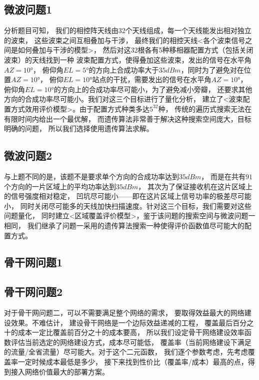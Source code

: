 \documentclass[UTF8,12pt]{ctexart}
\begin{document}
    \subsection{微波问题1}分析题目可知，
        我们的相控阵天线由32个天线组成，每一个天线能发出相对独立的波束，
        这些波束之间互相叠加与干涉，
        最终我们的相控天线<各个波束信号之间是如何叠加与干涉的模型>，
        然后对这32根各有5种移相器配置方式（包括关闭波束）的天线找到一种
        波束配置方式，使得叠加这些波束，发出的信号在水平角$AZ = 10°$，
        俯仰角$EL= 5°$的方向上合成功率大于$35dBm$，同时为了避免对在位置$AZ=10°$，
        俯仰$EL=10°$站点的干扰，需要发出的信号在水平角$AZ=10°$，
        俯仰角$EL=10°$的方向上的合成功率尽可能小，为了避免减小旁瓣，
        还要求其他方向的合成功率尽可能小。我们对这三个目标进行了量化分析，
        建立了<波束配置方式效用评价模型>。由于配置方式种类多达$5^{32}$种，
        传统的遍历式搜索无法在有限时间内给出一个最优解，
        而遗传算法非常善于解决这种搜索空间庞大，目标明确的问题，
        所以我们选择使用遗传算法求解。

    \subsection{微波问题2}
        与上题不同的是，该题不是要求单个方向的合成功率达到$35dBm$，
        而是在共有$91$个方向的一片区域上的平均功率达到$35dBm$，
        其次为了保证接收机在这片区域上的信号强度相对稳定，
        凹坑尽可能小——即在这片区域上信号功率的极差尽可能小，
        同时关闭尽可能多的天线加快扫描速度。针对这三个目标，我们需要对这些问题量化，
        同时建立<区域覆盖评价模型>，鉴于该问题的搜索空间与微波问题一相同，
        我们继承了问题一采用的遗传算法搜索一种使得评价函数值尽可能大的配置方式。

     
    \subsection{骨干网问题1}
    \subsection{骨干网问题2}
        对于骨干网问题二，可以不需要满足整个网络的需求，
        要取得效益最大的网络建设效果。不难估计，
        建设骨干网络是一个边际效益递减的工程，
        覆盖最后百分之十的成本一定比覆盖前百分之十的成本要高，
        所以我们设定骨干网络建设效率函数评估当前选定的网络建设方式，成本尽可能低，
        覆盖率（当前网络建设下满足的流量/全省流量）尽可能大。对于这个二元函数，
        我们逐个参数考虑，先考虑覆盖率一定时候成本最低是多少，
        接下来找到性价比（覆盖率/成本）最高的点，得到接入网络价值最大的部署方案。
        
\end{document}
